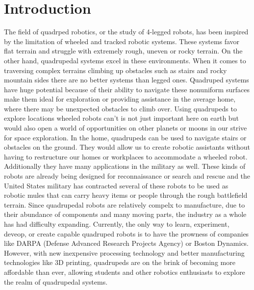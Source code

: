 \section{Introduction} \label{chap:Introduction}


    The field of quadrped robotics, or the study of 4-legged robots, has been inspired by the limitation of wheeled and tracked robotic systems. These systems favor flat terrain and struggle with extremely rough, uneven or rocky terrain. On the other hand, quadrupedal systems excel in these environments. When it comes to traversing complex terrains climbing up obstacles such as stairs and rocky mountain sides there are no better systems than legged ones. Quadruped systems have huge potential because of their ability to navigate these nonuniform surfaces make them ideal for exploration or providing assistance in the average home, where there may be unexpected obstacles to climb over. Using quadrupeds to explore locations wheeled robots can't is not just important here on earth but would also open a world of opportunities on other planets or moons in our strive for space exploration. In the home, quadrupeds can be used to navigate stairs or obstacles on the ground. They would allow us to create robotic assistants without having to restructure our homes or workplaces to accommodate a wheeled robot. Additionally they have many applications in the military as well. These kinds of robots are already being designed for reconnaissance or search and rescue and the United States military has contracted several of these robots to be used as robotic mules that can carry heavy items or people through the rough battlefield terrain. Since quadrupedal robots are relatively compelx to manufacture, due to their abundance of components and many moving parts, the industry as a whole has had difficulty expanding. Currently, the only way to learn, experiment, deveop, or create capable quadruped robots is to have the prowness of companies like DARPA (Defense Advanced Research Projects Agency) or Boston Dynamics. However, with new inexpensive processing technology and better manufacturing technologies like 3D printing, quadrupeds are on the brink of becoming more affordable than ever, allowing students and other robotics enthusiasts to explore the realm of quadrupedal systems.

